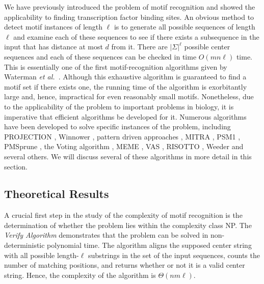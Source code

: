 We have previously introduced the problem of motif recognition and showed the applicability to finding transcription factor binding sites. An obvious method to detect motif instances of length $\ell$ is to generate all possible sequences of length $\ell$ and examine each of these sequences to see if there exists a subsequence in the input that has distance at most $d$ from it.  There are $|\Sigma|^{\ell}$ possible center sequences and each of these sequences can be checked in time $O(mn\ell)$ time. This is essentially one of the first motif-recognition algorithms given by Waterman {\em et al.}\ \cite{WAG84}.  Although this exhaustive algorithm is guaranteed to find a motif set if there exists one, the running time of the algorithm is exorbitantly large and, hence, impractical for even reasonably small motifs.  Nonetheless, due to the applicability of the problem to important problems in biology, it is imperative that efficient algorithms be developed for it.      Numerous algorithms have been developed to solve specific instances of the problem, including PROJECTION \cite{BT02}, Winnower \cite{PS00}, pattern driven approaches \cite{SLC04}, MITRA \cite{EP02}, PSM1 \cite{RBH05}, PMSprune \cite{JBR07}, the Voting algorithm \cite{CL05}, MEME \cite{BE95}, VAS \cite{CL06}, RISOTTO \cite{PCMS06}, Weeder \cite{PMMP04} and several others.  We will discuss several of these algorithms in more detail in this section.     

\subsection{Theoretical Results}

A crucial first step in the study of the complexity of motif recognition is the determination of whether the problem lies within the complexity class NP.  The {\em Verify Algorithm} demonstrates that the problem can be solved in non-deterministic polynomial time.  The algorithm aligns the supposed center string with all possible length-$\ell$ substrings in the set of the input sequences, counts the number of matching positions, and returns whether or not it is a valid center string.  Hence, the complexity of the algorithm is $\Theta(nm\ell)$.  

